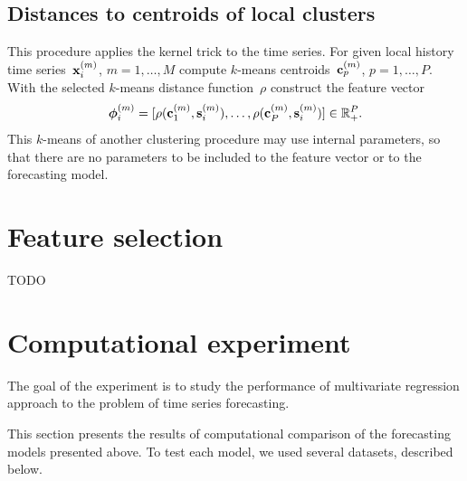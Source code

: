 \documentclass[conference]{IEEEtran}
\begin{document}
\subsection{Distances to centroids of local clusters}
This procedure applies the kernel trick to the time series. For given local history time series~${\mathbf{x}}_i^{(m)}$, $m=1,\dots, M$ compute $k$-means centroids~${\mathbf{c}}_p^{(m)}$, $p = 1, \dots, P$.  With the selected $k$-means distance function~$\rho$ construct the feature vector
\[
{\boldsymbol{\phi}}_i^{(m)} = [\rho({\mathbf{c}}_1^{(m)},{\mathbf{s}}_i^{(m)}),\dots,\rho({\mathbf{c}}^{(m)}_P,{\mathbf{s}}_i^{(m)})] \in \mathbb{R}_+^P.
\]
This $k$-means of another clustering procedure may use internal parameters, so that there are no parameters to be included to the feature vector or to the forecasting model.



\section{Feature selection}
TODO



\section{Computational experiment}
The goal of the experiment is to study the performance of multivariate regression approach to the problem of 
time series forecasting.

This section presents the results of computational comparison of the forecasting models presented above. To test each model, we used several datasets, described below.
\end{document}

